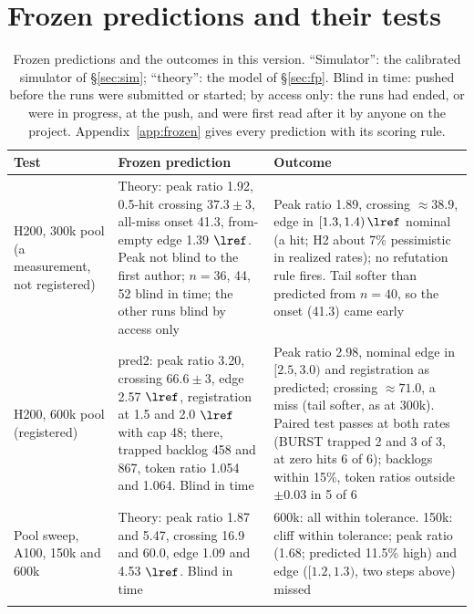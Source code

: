 \section{Frozen predictions and their tests}\label{sec:frozen}

\begin{table}[!tp]
\centering\footnotesize
\caption{Frozen predictions and the outcomes in this version. ``Simulator'': the calibrated simulator of \S\ref{sec:sim}; ``theory'': the model of \S\ref{sec:fp}. Blind in time: pushed before the runs were submitted or started; by access only: the runs had ended, or were in progress, at the push, and were first read after it by anyone on the project. Appendix~\ref{app:frozen} gives every prediction with its scoring rule.}\label{tab:frozensum}
\setlength{\tabcolsep}{3pt}
\begin{tabular}{@{}>{\raggedright\arraybackslash}p{3.0cm} >{\raggedright\arraybackslash}p{7.4cm} >{\raggedright\arraybackslash}p{6.5cm}@{}}
\toprule
Test & Frozen prediction & Outcome\\
\midrule
H200, 300k pool (a measurement, not registered) & Theory: peak ratio 1.92, 0.5-hit crossing $37.3\pm3$, all-miss onset 41.3, from-empty edge 1.39 $\lref$. Peak not blind to the first author; $n=36$, 44, 52 blind in time; the other runs blind by access only & Peak ratio 1.89, crossing $\approx38.9$, edge in $[1.3,1.4)\,\lref$ nominal (a hit; H2 about 7\% pessimistic in realized rates); no refutation rule fires. Tail softer than predicted from $n=40$, so the onset (41.3) came early\\
\addlinespace[0.3pt]
H200, 600k pool (registered) & pred2: peak ratio 3.20, crossing $66.6\pm3$, edge 2.57 $\lref$, registration at 1.5 and 2.0 $\lref$ with cap 48; there, trapped backlog 458 and 867, token ratio 1.054 and 1.064. Blind in time & Peak ratio 2.98, nominal edge in $[2.5,3.0)$ and registration as predicted; crossing $\approx71.0$, a miss (tail softer, as at 300k). Paired test passes at both rates (BURST trapped 2 and 3 of 3, at zero hits 6 of 6); backlogs within 15\%, token ratios outside $\pm0.03$ in 5 of 6\\
\addlinespace[0.3pt]
Pool sweep, A100, 150k and 600k & Theory: peak ratio 1.87 and 5.47, crossing 16.9 and 60.0, edge 1.09 and 4.53 $\lref$. Blind in time & 600k: all within tolerance. 150k: cliff within tolerance; peak ratio (1.68; predicted 11.5\% high) and edge ($[1.2,1.3)$, two steps above) missed\\
\addlinespace[0.3pt]

\end{tabular}
\end{table}

